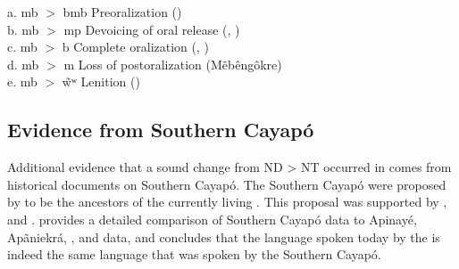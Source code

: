 \documentclass[output=paper,hidelinks]{langscibook}
\begin{document}
\ea\label{change} a. mb $>$ bmb	\hspace{1.01cm}		Preoralization			\hspace{2.7cm}		()\\
	b. mb $>$ mp	\hspace{1.2cm}		Devoicing of oral release	\hspace{.98cm}	(, )\\
	c. mb $>$ b	\hspace{1.51cm}		Complete oralization		\hspace{1.6cm}	(, )\\
	d. mb $>$ m	\hspace{1.4cm}		Loss of postoralization	\hspace{1.29cm}		(M\~eb\^eng\^okre)\\
	e. mb $>$ \~wʷ	\hspace{1.25cm}		Lenition	\hspace{3.53cm}		()\\
\z

\subsection{Evidence from Southern Cayap\'o}\label{sec:lapierre:3.3}
\begin{sloppypar}
Additional evidence that a sound change from ND > NT occurred in  comes from historical documents on Southern Cayap\'o. The Southern Cayap\'o were proposed by \citet{Heelas1979} to be the ancestors of the currently living . This proposal was supported by \citet{Schwartzman1988, RodriguesDourado1993, Giraldin1997, Giraldin2000}, and \citet{Dourado2004}. \citet{Vasconcelos2013} provides a detailed comparison of Southern Cayap\'o data to Apinay\'e, Ap\~aniekr\'a, , and  data, and concludes that the language spoken today by the  is indeed the same language that was spoken by the Southern Cayap\'o.
\end{sloppypar}
\end{document}
